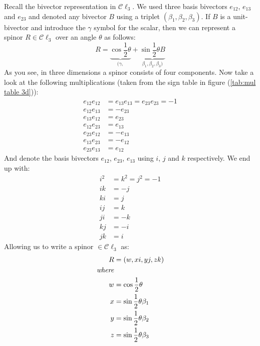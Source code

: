 \documentclass[10pt]{report}
\begin{document}
Recall the bivector representation in $\mathcal{C}\ell_3$. We used
three basis bivectors $e_{12}$, $e_{13}$ and $e_{23}$ and denoted
any bivector $B$ using a triplet $(\beta_1, \beta_2, \beta_3)$. If
$B$ is a unit-bivector and introduce the $\gamma$ symbol for the
scalar, then we can represent a spinor $R \in \mathcal{C}\ell_3$
over an angle $\theta$ as follows:
\begin{displaymath}
    R = \underbrace{\cos \frac{1}{2} \theta}_{(\gamma, }  + \underbrace{\sin \frac{1}{2}\theta B}_{\beta_1, \beta_2,
    \beta_3)}
\end{displaymath}
As you see, in three dimensions a spinor consists of four
components. Now take a look at the following multiplications
(taken from the sign table in figure (\ref{tab:mul table 3d})):
\begin{align*}
    e_{12}e_{12} &= e_{13}e_{13} = e_{23}e_{23} = -1    \\
    e_{12}e_{13} &= -e_{23} \\
    e_{13}e_{12} &= e_{23} \\
    e_{12}e_{23} &= e_{13} \\
    e_{23}e_{12} &= -e_{13} \\
    e_{13}e_{23} &= -e_{12} \\
    e_{23}e_{13} &= e_{12}
\end{align*}
And denote the basis bivectors $e_{12}$, $e_{23}$, $e_{13}$ using
$i$, $j$ and $k$ respectively. We end up with:
\begin{align*}
    i^2 &= k^2 = j^2 = -1    \\
    ik &= -j \\
    ki &= j \\
    ij &= k \\
    ji &= -k \\
    kj &= -i \\
    jk &= i
\end{align*}
Allowing us to write a spinor $\in \mathcal{C}\ell_3$ as:
\begin{align*}
    R &= (w, xi, yj, zk)                \\
    \text{\emph{where}}                 \\
    w &= \cos \frac{1}{2} \theta        \\
    x &=\sin \frac{1}{2} \theta \beta_1  \\
    y &=\sin \frac{1}{2} \theta \beta_2  \\
    z &=\sin \frac{1}{2} \theta \beta_3
\end{align*}
\end{document}
